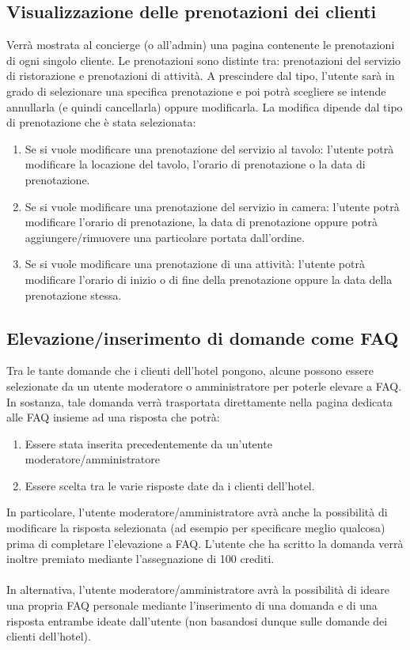 \documentclass [a4paper, 12pt]{book}
\begin{document}
\subsection{Visualizzazione delle prenotazioni dei clienti}
\label{VisualizzaPrenotazioniClienti}
Verrà mostrata al concierge (o all'admin) una pagina contenente le prenotazioni di ogni singolo cliente. Le prenotazioni sono distinte tra: prenotazioni del servizio di ristorazione e prenotazioni di attività. A prescindere dal tipo, l'utente sarà in grado di selezionare una specifica prenotazione e poi potrà scegliere se intende annullarla (e quindi cancellarla) oppure modificarla. La modifica dipende dal tipo di prenotazione che è stata selezionata:
\begin{enumerate}
\item Se si vuole modificare una prenotazione del servizio al tavolo: l'utente potrà modificare la locazione del tavolo, l'orario di prenotazione o la data di prenotazione.
\item Se si vuole modificare una prenotazione del servizio in camera: l'utente potrà modificare l'orario di prenotazione, la data di prenotazione oppure potrà aggiungere/rimuovere una particolare portata dall'ordine.
\item Se si vuole modificare una prenotazione di una attività: l'utente potrà modificare l'orario di inizio o di fine della prenotazione oppure la data della prenotazione stessa.
\end{enumerate}

\medskip

\subsection{Elevazione/inserimento di domande come FAQ}
Tra le tante domande che i clienti dell'hotel pongono, alcune possono essere selezionate da un utente moderatore o amministratore per poterle elevare a FAQ. In sostanza, tale domanda verrà trasportata direttamente nella pagina dedicata alle FAQ insieme ad una risposta che potrà:
\begin{enumerate}
\item Essere stata inserita precedentemente da un'utente moderatore/amministratore
\item Essere scelta tra le varie risposte date da i clienti dell'hotel.
\end{enumerate}
In particolare, l'utente moderatore/amministratore avrà anche la possibilità di modificare la risposta selezionata (ad esempio per specificare meglio qualcosa) prima di completare l'elevazione a FAQ. L'utente che ha scritto la domanda verrà inoltre premiato mediante l'assegnazione di 100 crediti.\\\\
In alternativa, l'utente moderatore/amministratore avrà la possibilità di ideare una propria FAQ personale mediante l'inserimento di una domanda e di una risposta entrambe ideate dall'utente (non basandosi dunque sulle domande dei clienti dell'hotel).
\end{document}
